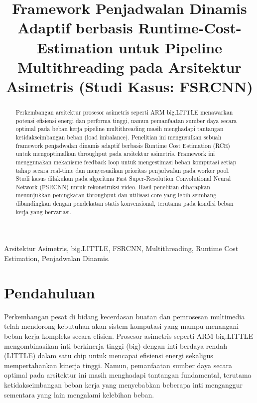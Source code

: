\documentclass[conference]{IEEEtran}
\begin{document}
\title{Framework Penjadwalan Dinamis Adaptif berbasis Runtime-Cost-Estimation untuk Pipeline Multithreading pada Arsitektur Asimetris (Studi Kasus: FSRCNN)}

\author{
}

\maketitle

\begin{abstract}
Perkembangan arsitektur prosesor asimetris seperti ARM big.LITTLE menawarkan potensi efisiensi energi dan performa tinggi, namun pemanfaatan sumber daya secara optimal pada beban kerja pipeline multithreading masih menghadapi tantangan ketidakseimbangan beban (load imbalance). Penelitian ini mengusulkan sebuah framework penjadwalan dinamis adaptif berbasis Runtime Cost Estimation (RCE) untuk mengoptimalkan throughput pada arsitektur asimetris. Framework ini menggunakan mekanisme feedback loop untuk mengestimasi beban komputasi setiap tahap secara real-time dan menyesuaikan prioritas penjadwalan pada worker pool. Studi kasus dilakukan pada algoritma Fast Super-Resolution Convolutional Neural Network (FSRCNN) untuk rekonstruksi video. Hasil penelitian diharapkan menunjukkan peningkatan throughput dan utilisasi core yang lebih seimbang dibandingkan dengan pendekatan statis konvensional, terutama pada kondisi beban kerja yang bervariasi.
\end{abstract}

\begin{IEEEkeywords}
Arsitektur Asimetris, big.LITTLE, FSRCNN, Multithreading, Runtime Cost Estimation, Penjadwalan Dinamis.
\end{IEEEkeywords}

\section{Pendahuluan}
Perkembangan pesat di bidang kecerdasan buatan dan pemrosesan multimedia telah mendorong kebutuhan akan sistem komputasi yang mampu menangani beban kerja kompleks secara efisien. Prosesor asimetris seperti ARM big.LITTLE mengombinasikan inti berkinerja tinggi (big) dengan inti berdaya rendah (LITTLE) dalam satu chip untuk mencapai efisiensi energi sekaligus mempertahankan kinerja tinggi. Namun, pemanfaatan sumber daya secara optimal pada arsitektur ini masih menghadapi tantangan fundamental, terutama ketidakseimbangan beban kerja yang menyebabkan beberapa inti menganggur sementara yang lain mengalami kelebihan beban.
\end{document}
